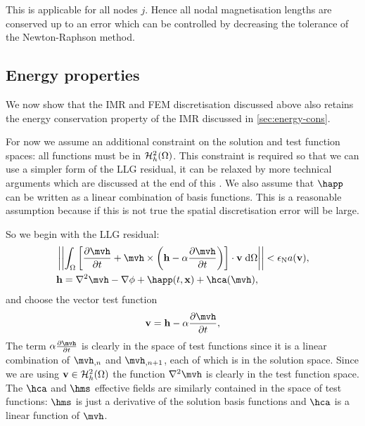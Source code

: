 {This is applicable for all nodes $j$.
Hence all nodal magnetisation lengths are conserved up to an error which can be controlled by decreasing the tolerance of the Newton-Raphson method.


\subsection{Energy properties}

\newcommand{\midpoint}[1]{\hat{#1}}
\newsubcommand{\mvm}{\midpoint{\mv}}{n}
\newcommand{\tm}{\midpoint{t}_n}
\newcommand{\dtop}{\delta}
\newcommand{\pdsub}[3]{\mathrlap{\pd{#1\mathrlap{_{#2}}}{#3}}\phantom{\pd{#1_{#2}}{#3}}}
\newcommand{\dmdtm}{\dtop \mv}
\newcommand{\dmdtml}{\dtop \mv_{n,l}}
\newcommand{\dmdtmj}{\dtop \mv_{n,j}}

\newcommand{\ipg}[2]{\intd{{#1} \cdot {#2}}}

We now show that the IMR and FEM discretisation discussed above also retains the energy conservation property of the IMR discussed in \cref{sec:energy-cons}.

For now we assume an additional constraint on the solution and test function spaces: all functions must be in $\mathcal{H}_h^2(\Omega)$.
This constraint is required so that we can use a simpler form of the LLG residual, it can be relaxed by more technical arguments which are discussed at the end of this .
We also assume that $\happ$ can be written as a linear combination of basis functions.
This is a reasonable assumption because if this is not true the spatial discretisation error will be large.

So we begin with the LLG residual:
\begin{equation}
  \begin{aligned}
    &\norm{\intd{ \bigs{\dmdth + \mvh \times \bigb{\hv - \dampc \dmdth}} \cdot \testv}} < \ntol \sumbasiscoeff(\testv), \\
      &\hv = \lap \mvh - \nabla \phim + \happ(t, \xv) + \hca(\mvh),
    \end{aligned}
  \label{eq:85}
\end{equation}
and choose the vector test function
\begin{equation}
  \testv = \hv - \dampc \dmdth,
  \label{eq:84}
\end{equation}
The term $\dampc \dmdth$ is clearly in the space of test functions since it is a linear combination of $\mvh_{,n}$ and $\mvh_{,n+1}$, each of which is in the solution space.
Since we are using $\boldsymbol{\mathrm{v}} \in \mathcal{H}_h^2(\Omega)$ the function $\lap \mvh$ is clearly in the test function space.
The $\hca$ and $\hms$ effective fields are similarly contained in the space of test functions: $\hms$ is just a derivative of the solution basis functions and $\hca$ is a linear function of $\mvh$.

}
